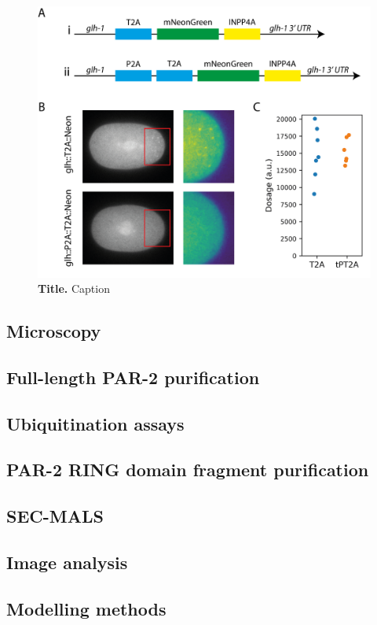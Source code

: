 \documentclass[12pt]{"article"}
\newcommand{\mycaption}[2]{\caption[#1]{\textbf{#1.} #2}}
\begin{document}
\begin{figure}[!h]
\includegraphics[scale=1]{glh}
\setlength{\abovecaptionskip}{20pt}
\centering
\mycaption{Title}{Caption}
\label{fig:glh}
\end{figure}



\subsection{Microscopy}
\subsection{Full-length PAR-2 purification}
\subsection{Ubiquitination assays}
\subsection{PAR-2 RING domain fragment purification}
\subsection{SEC-MALS}
\subsection{Image analysis}
\subsection{Modelling methods}
\end{document}
